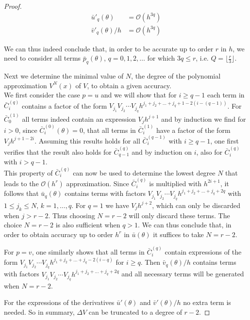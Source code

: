 \begin{proof}
    \begin{align*}
        \bar{u}'_{q}(\theta)   & =  \mathcal{O}(h^{3q}) \\
        \bar{v}'_{q}(\theta)/h & = \mathcal{O}(h^{3q})
    \end{align*}

    We can thus indeed conclude that, in order to be accurate up to order $r$ in $h$, we need to consider all terms $\bar{p}_q(\theta)$, $q=0,1,2,\ldots$ for which $3q \leq r$, i.e. $Q= \lfloor \frac{r}{3} \rfloor$.

    Next we determine the minimal value of $N$, the degree of the polynomial approximation $V^{N}(x)$ of $V$, to obtain a given accuracy. \\
    We first consider the case $p=u$ and we will show that for $i \geq q-1$ each term in $\bar{C}_i^{(q)}$ contains a factor of the form
    $ V_{j_1} V_{j_2} \cdots V_{j_q} h^{j_1+j_2+\ldots+j_q+1 - 2 (i-(q-1))}$.
    For $\bar{C}_0^{(1)}$ all terms indeed contain an expression $V_j h^{j+1}$ and by induction we find for $i>0$, since $\bar{C}_i^{(0)}(\theta)=0$, that all terms in $\bar{C}_i^{(1)}$ have a factor of the form $V_j h^{j+1-2i}$.
    Assuming this results holds for all $\bar{C}_i^{(q-1)}$ with $i\geq q - 1$, one first verifies that the result also holds for
    $\bar{C}_{q-1}^{(q)}$ and by induction on $i$,  also for $\bar{C}_{i}^{(q)}$ with $i>q-1$.\\
    This property of $\bar{C}_i^{(q)}$ can now be used to determine the lowest degree $N$ that leads to the $\mathcal{O}(h^r)$ approximation. Since $\bar{C}_i^{(q)}$ is multiplied with $h^{2i+1}$, it follows that  $\bar{u}_q(\theta)$ contains terms with factors $ V_{j_1} V_{j_2} \cdots V_{j_q} h^{j_1+j_2+\ldots+j_q+ 2 q }$ with
    $1 \leq j_k \leq N$, $k=1,\ldots, q$. For $q=1$ we have $V_{j} h^{j+2} $, which can only be discarded when $j>r-2$. Thus choosing $N=r-2$ will only discard these terms. The choice $N=r-2$ is also sufficient when $q>1$. We can thus conclude that, in order to obtain accuracy up to order $h^r$ in $\bar{u}(\theta)$ it suffices to take $N=r-2$.


    For $p=v$, one similarly shows that all terms in $\bar{C}_i^{(q)}$ contain expressions of the form $ V_{j_1} V_{j_2} \cdots V_{j_q} h^{j_1+j_2+\ldots+j_q - 2 (i-q)}$ for $i \geq q$. Then $\bar{v}_q(\theta)/h$ contains terms with factors $ V_{j_1} V_{j_2} \cdots V_{j_q} h^{j_1+j_2+\ldots+j_q+ 2 q}$ and all necessary terms will be generated when $N = r-2$.

    For the expressions of the derivatives $\bar{u}'(\theta)$ and $\bar{v}'(\theta)/h$ no extra term is needed. So in summary, $\Delta V$ can be truncated to a degree of $r - 2$.

\end{proof}

